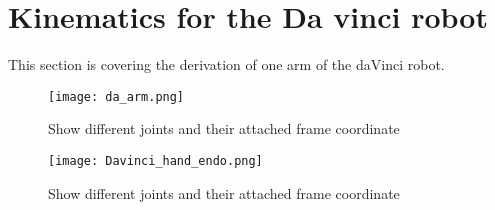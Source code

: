 \section{Kinematics for the Da vinci robot}
This section is covering the derivation of one arm of the daVinci robot. 
\begin{sidewaysfigure}
		\centering
		\texttt{[image: da\_arm.png]}
		\caption{Show different joints and their attached frame coordinate}
		\label{fig:da_ha_en}
\end{sidewaysfigure}



\begin{sidewaysfigure}
		\centering
		\texttt{[image: Davinci\_hand\_endo.png]}
		\caption{Show different joints and their attached frame coordinate}
		\label{fig:da_ha_en}
\end{sidewaysfigure}

